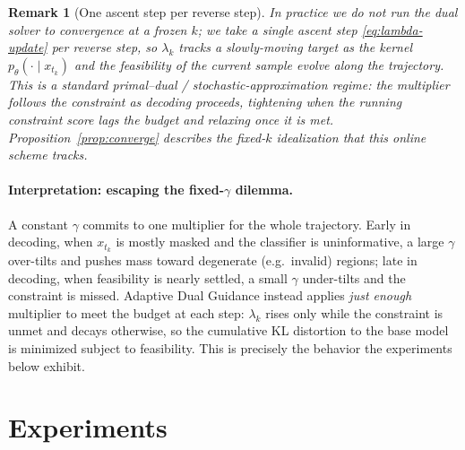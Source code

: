 \documentclass{article}
\newtheorem{remark}{Remark}
\begin{document}
\begin{remark}[One ascent step per reverse step]
\label{rmk:onestep}
In practice we do not run the dual solver to convergence at a frozen $k$; we take a \emph{single} ascent step \eqref{eq:lambda-update} per reverse step, so $\lambda_k$ tracks a slowly-moving target as the kernel $p_\theta(\cdot\mid x_{t_k})$ and the feasibility of the current sample evolve along the trajectory. This is a standard primal--dual / stochastic-approximation regime: the multiplier follows the constraint as decoding proceeds, tightening when the running constraint score lags the budget and relaxing once it is met. Proposition~\ref{prop:converge} describes the fixed-$k$ idealization that this online scheme tracks.
\end{remark}

\paragraph{Interpretation: escaping the fixed-$\gamma$ dilemma.} A constant $\gamma$ commits to one multiplier for the whole trajectory. Early in decoding, when $x_{t_k}$ is mostly masked and the classifier is uninformative, a large $\gamma$ over-tilts and pushes mass toward degenerate (e.g.\ invalid) regions; late in decoding, when feasibility is nearly settled, a small $\gamma$ under-tilts and the constraint is missed. Adaptive Dual Guidance instead applies \emph{just enough} multiplier to meet the budget at each step: $\lambda_k$ rises only while the constraint is unmet and decays otherwise, so the cumulative KL distortion to the base model is minimized subject to feasibility. This is precisely the behavior the experiments below exhibit.

\clearpage
\section{Experiments}
\label{sec:experiments}
\end{document}
